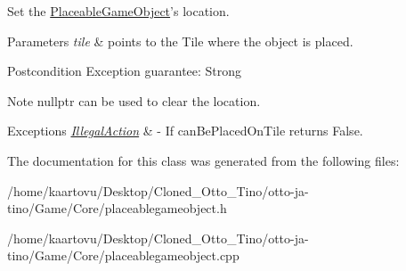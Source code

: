 Set the \hyperlink{class_course_1_1_placeable_game_object}{Placeable\-Game\-Object}'s location. 


\begin{DoxyParams}{Parameters}
{\em tile} & points to the Tile where the object is placed. \\
\hline
\end{DoxyParams}
\begin{DoxyPostcond}{Postcondition}
Exception guarantee\-: Strong 
\end{DoxyPostcond}
\begin{DoxyNote}{Note}
nullptr can be used to clear the location. 
\end{DoxyNote}

\begin{DoxyExceptions}{Exceptions}
{\em \hyperlink{class_course_1_1_illegal_action}{Illegal\-Action}} & -\/ If can\-Be\-Placed\-On\-Tile returns False. \\
\hline
\end{DoxyExceptions}


The documentation for this class was generated from the following files\-:\begin{DoxyCompactItemize}
\item 
/home/kaartovu/\-Desktop/\-Cloned\-\_\-\-Otto\-\_\-\-Tino/otto-\/ja-\/tino/\-Game/\-Core/placeablegameobject.\-h\item 
/home/kaartovu/\-Desktop/\-Cloned\-\_\-\-Otto\-\_\-\-Tino/otto-\/ja-\/tino/\-Game/\-Core/placeablegameobject.\-cpp\end{DoxyCompactItemize}
